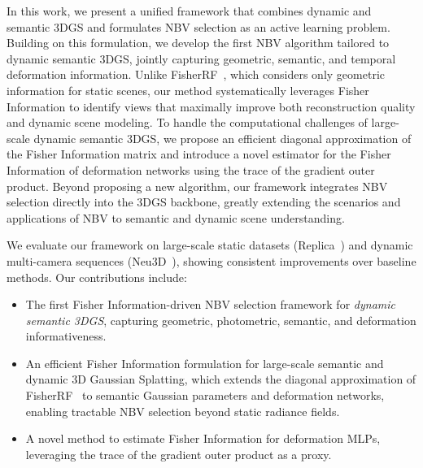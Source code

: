 In this work, we present a unified framework that combines dynamic and semantic 3DGS and formulates NBV selection as an active learning problem. Building on this formulation, we develop the first NBV algorithm tailored to dynamic semantic 3DGS, jointly capturing geometric, semantic, and temporal deformation information. Unlike FisherRF~\cite{fisherrf}, which considers only geometric information for static scenes, our method systematically leverages Fisher Information to identify views that maximally improve both reconstruction quality and dynamic scene modeling. To handle the computational challenges of large-scale dynamic semantic 3DGS, we propose an efficient diagonal approximation of the Fisher Information matrix and introduce a novel estimator for the Fisher Information of deformation networks using the trace of the gradient outer product. Beyond proposing a new algorithm, our framework integrates NBV selection directly into the 3DGS backbone, greatly extending the scenarios and applications of NBV to semantic and dynamic scene understanding. 

We evaluate our framework on large-scale static datasets (Replica~\cite{replica}) and dynamic multi-camera sequences (Neu3D~\cite{dynerf}), showing consistent improvements over baseline methods. Our contributions include:
\begin{itemize}
    \item The first Fisher Information-driven NBV selection framework for \emph{dynamic semantic 3DGS}, capturing geometric, photometric, semantic, and deformation informativeness.
    \item An efficient Fisher Information formulation for large-scale semantic and dynamic 3D Gaussian Splatting, which extends the diagonal approximation of FisherRF~\cite{fisherrf} to semantic Gaussian parameters and deformation networks, enabling tractable NBV selection beyond static radiance fields.
    \item A novel method to estimate Fisher Information for deformation MLPs, leveraging the trace of the gradient outer product as a proxy.
\end{itemize}
